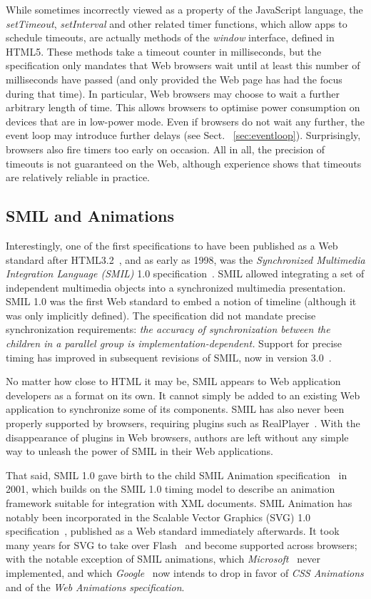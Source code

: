 While sometimes incorrectly viewed as a property of the JavaScript language,
the \emph{setTimeout}, \emph{setInterval} and other related timer functions,
which allow apps to schedule timeouts, are actually methods of the
\emph{window} interface, defined in HTML5. These methods take a timeout
counter in milliseconds, but the specification only mandates that Web browsers
wait until at least this number of milliseconds have passed (and only provided
the Web page has had the focus during that time). In particular, Web browsers
may choose to wait a further arbitrary length of time. This allows browsers to
optimise power consumption on devices that are in low-power mode. Even if
browsers do not wait any further, the event loop may introduce further delays
(see Sect. ~\ref{sec:eventloop}). Surprisingly, browsers also fire timers too
early on occasion. All in all, the precision of timeouts is not guaranteed on
the Web, although experience shows that timeouts are relatively reliable in
practice.

\subsection{SMIL and Animations}
\label{sec:smil}

Interestingly, one of the first specifications to have been published as a Web
standard after HTML3.2~\cite{html32}, and as early as 1998, was the
\emph{Synchronized Multimedia Integration Language (SMIL)} 1.0
specification~\cite{smil1}. SMIL allowed integrating a set of independent
multimedia objects into a synchronized multimedia presentation. SMIL 1.0 was
the first Web standard to embed a notion of timeline (although it was only
implicitly defined). The specification did not mandate precise synchronization
requirements: \emph{the accuracy of synchronization between the children in a
parallel group is implementation-dependent.} Support for precise timing has
improved in subsequent revisions of SMIL, now in version 3.0~\cite{smil3}.

No matter how close to HTML it may be, SMIL appears to Web application
developers as a format on its own. It cannot simply be added to an existing
Web application to synchronize some of its components. SMIL has also never
been properly supported by browsers, requiring plugins such as
RealPlayer~\cite{realplayer}. With the disappearance of plugins in Web
browsers, authors are left without any simple way to unleash the power of SMIL
in their Web applications.

That said, SMIL 1.0 gave birth to the child SMIL Animation
specification~\cite{smilanimation} in 2001, which builds on the SMIL 1.0
timing model to describe an animation framework suitable for integration with
XML documents. SMIL Animation has notably been incorporated in the Scalable
Vector Graphics (SVG) 1.0 specification~\cite{svg}, published as a Web
standard immediately afterwards. It took many years for SVG to take over
Flash~\cite{flash} and become supported across browsers; with the notable
exception of SMIL animations, which \emph{Microsoft}~\cite{microsoft} never
implemented, and which \emph{Google}~\cite{google} now intends to drop in
favor of \emph{CSS Animations} and of the \emph{Web Animations specification}.

